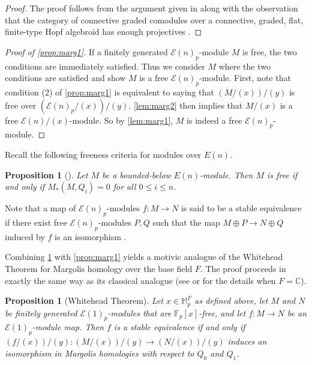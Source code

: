 \documentclass{amsart}
\newtheorem{proposition}[theorem]{Proposition}
\theoremstyle{plain}
\numberwithin{theorem}{section}
\numberwithin{equation}{section}
\numberwithin{figure}{section}
\newcommand{\mC}{{\mathbb C}}
\newcommand{\mF}{{\mathbb F}}
\newcommand{\cE}{{\mathcal E}}
\newcommand{\0}{\langle 0 \rangle }
\begin{document}
\begin{proof}
    The proof follows from the argument given in \cite[Lemma 5.2]{HeardKrause18} along with the observation that the category of connective graded comodules over a connective, graded, flat, finite-type Hopf algebroid has enough projectives \cite{Salch23}.
\end{proof}

\begin{proof}[Proof of \cref{prop:marg1}]
If a finitely generated $\cE(n)_p$-module $M$ is free, the two conditions are immediately satisfied. Thus we consider $M$ where the  two conditions are satisfied and show $M$ is a free $\cE(n)_p$-module. First, note that condition (2) of \cref{prop:marg1} is equivalent to saying that $(M / (x))/(y)$ is free over $(\cE(n)_p/(x))/(y)$. \cref{lem:marg2} then implies that $M / (x)$ is a free $\cE(n)/ (x)$-module. So by \cref{lem:marg1}, $M$ is indeed a free $\cE(n)_p$-module.
\end{proof}
Recall the following freeness criteria for modules over $E(n)$.
\begin{proposition}[{\cite[Theorem 18.8i]{Margolis83}}] \label{prop:MargClassical}
    Let $M$ be a bounded-below $E(n)$-module. Then $M$ is free if and only if $M_*(M, Q_i) = 0$ for all $0 \leq i \leq n$. 
\end{proposition}
Note that a map of $\cE(n)_p$-modules $f:M \to N$ is said to be a stable equivalence if there exist free $\cE(n)_p$-modules $P,Q$ such that the map $M \oplus P \to N \oplus Q$ induced by $f$ is an isomorphism \cite[p. 205]{Margolis83}.

Combining \cref{prop:MargClassical} with \cref{prop:marg1} yields a motivic analogue of the Whitehead Theorem for Margolis homology over the base field $F$. The proof proceeds in exactly the same way as its classical analogue (see \cite[Theorem 18.8ii]{Margolis83} or \cite[Corollary 4.10]{GheorgheIsaksenRicka18} for the details when $F = \mC$).

\begin{proposition}[Whitehead Theorem] \label{prop:MotivicWhitehead}
    Let $x \in \mathbb{M}_p^F$ as defined above, let $M$ and $N$ be finitely generated $\cE(1)_p$-modules that are $\mF_p [ x]$-free, and let $f: M \to N$ be an $\cE(1)_p$-module map. Then $f$ is a stable equivalence if and only if $(f/(x))/(y): (M/(x))/(y) \to (N/(x))/(y)$ induces an isomorphism in Margolis homologies with respect to $Q_0$ and $Q_1$. 
\end{proposition}
\end{document}

